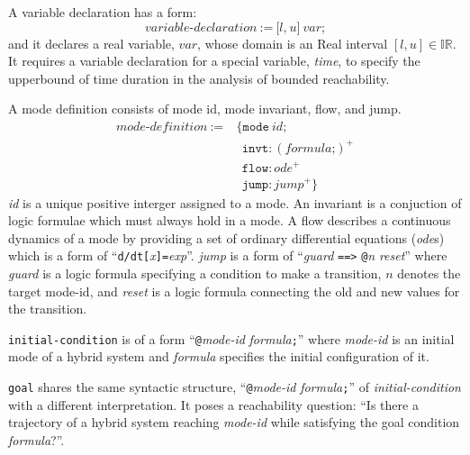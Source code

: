 A variable declaration has a form:
\[
\textit{variable-declaration} \ := \ \texttt{[}
                                     \textit{l}
                                     \texttt{,}
                                     \ \textit{u}
                                     \texttt{]}
                                     \ \textit{var}
                                     \texttt{;}
\]
and it declares a real variable, $var$, whose domain is an Real
interval $[l, u] \in \mathbb{IR}$. It requires a variable declaration
for a special variable, \textit{time}, to specify the upperbound of
time duration in the analysis of bounded reachability.

A mode definition consists of mode id, mode invariant, flow, and jump.
\begin{align*}
  \textit{mode-definition} \ := & \ \texttt{\{}
                                    \texttt{mode} \ \textit{id}\texttt{;}\\
                           & \ \ \  \texttt{invt}:(\textit{formula} \texttt{;})^+\\
                           & \ \ \  \texttt{flow}:\textit{ode}^+\\
                           & \ \ \ \texttt{jump}:\textit{jump}^+ \texttt{\}}
\end{align*}
\textit{id} is a unique positive interger assigned to a mode. An
invariant is a conjuction of logic formulae which must always hold in
a mode. A flow describes a continuous dynamics of a mode by providing
a set of ordinary differential equations (\textit{ode}s) which is a
form of
``\texttt{d/dt[}\textit{x}\texttt{]=}\textit{exp}''. \textit{jump} is
a form of ``\textit{guard} \texttt{==>} \texttt{@}\textit{n}
\textit{reset}'' where \textit{guard} is a logic formula specifying a
condition to make a transition, $n$ denotes the target mode-id, and
\textit{reset} is a logic formula connecting the old and new values
for the transition.

\texttt{initial-condition} is of a form
``\texttt{@}\textit{mode-id} \textit{formula}\texttt{;}''
where \textit{mode-id} is an initial mode of a hybrid system and
\textit{formula} specifies the initial configuration of it.

\texttt{goal} shares the same syntactic structure,
``\texttt{@}\textit{mode-id} \textit{formula}\texttt{;}'' of
\textit{initial-condition} with a different interpretation. It poses a
reachability question: ``Is there a trajectory of a hybrid system
reaching \textit{mode-id} while satisfying the goal condition \textit{formula}?''.

